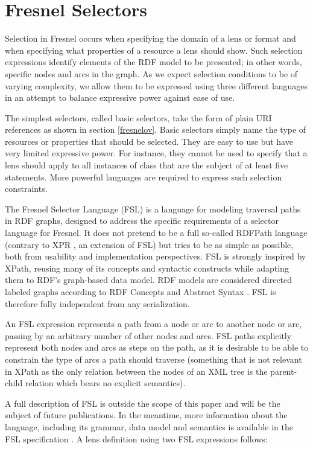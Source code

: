 \section{Fresnel Selectors}
\label{selectors}

Selection in Fresnel occurs when specifying the domain of a lens or format and when specifying what properties of a resource a lens should show. Such selection expressions identify elements of the RDF model to be presented; in other words, specific nodes and arcs in the graph. As we expect selection conditions to be of varying complexity, we allow them to be expressed using three different languages in an attempt to balance expressive power against ease of use.

The simplest selectors, called basic selectors, take the form of plain URI references as shown in section \ref{fresnelov}. Basic selectors simply name the type of resources or properties that should be selected. They are easy to use but have very limited expressive power. For instance, they cannot be used to specify that a lens should apply to all instances of class  that are the subject of at least five  statements. More powerful languages are required to express such selection constraints.

The Fresnel Selector Language (FSL) is a language for modeling traversal paths in RDF graphs, designed to address the specific requirements of a selector language for Fresnel. It does not pretend to be a full so-called RDFPath language (contrary to XPR \cite{xpr06}, an extension of FSL) but tries to be as simple as possible, both from usability and implementation perspectives. FSL is strongly inspired by XPath, reusing many of its concepts and syntactic constructs while adapting them to RDF's graph-based data model. RDF models are considered directed labeled graphs according to RDF Concepts and Abstract Syntax \cite{rdfcas04}. FSL is therefore fully independent from any serialization.

An FSL expression represents a path from a node or arc to another node or arc, passing by an arbitrary number of other nodes and arcs. FSL paths explicitly represent both nodes and arcs as steps on the path, as it is desirable to be able to constrain the type of arcs a path should traverse (something that is not relevant in XPath as the only relation between the nodes of an XML tree is the parent-child relation which bears no explicit semantics).

A full description of FSL is outside the scope of this paper and will be the subject of future publications. In the meantime, more information about the language, including its grammar, data model and semantics is available in the FSL specification \cite{fsl05}. A lens definition using two FSL expressions follows:

